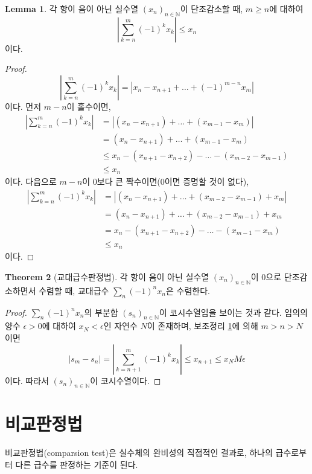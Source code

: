 \documentclass[11pt]{book}
\numberwithin{equation}{chapter}
\def\NN{\mathbb{N}}
\def\eps{\epsilon}
\newcommand{\abs}[1]{\left\vert#1\right\vert}
\theoremstyle{definition}
\newtheorem{thm}{Theorem}[section]
\newtheorem{lem}[thm]{Lemma}
\begin{document}
\begin{lem} \label{lem 5.2.2}
    각 항이 음이 아닌 실수열 \((x_n)_{n \in \NN}\)이 단조감소할 때, \(m \ge n\)에 대하여
    \[
    \abs{\sum_{k=n}^m (-1)^k x_k } \le x_n
    \]
    이다.
\end{lem}
\begin{proof}
    \[
        \abs{\sum_{k=n}^m (-1)^k x_k } = \abs{x_n - x_{n+1} + \ldots + (-1)^{m-n} x_m}
    \]
    이다. 먼저 \(m - n\)이 홀수이면,
    \begin{align*}
        \abs{\sum_{k=n}^m (-1)^k x_k } &= \abs{(x_n - x_{n+1}) + \ldots + (x_{m-1} - x_m)}\\
        &= (x_n - x_{n+1}) + \ldots + (x_{m-1} - x_m)\\
        &\le x_n - (x_{n+1} - x_{n+2}) - \ldots - (x_{m-2} - x_{m-1})\\
        &\le x_n
    \end{align*}
    이다. 다음으로 \(m - n\)이 0보다 큰 짝수이면(0이면 증명할 것이 없다),
    \begin{align*}
        \abs{\sum_{k=n}^m (-1)^k x_k } &= \abs{(x_n - x_{n+1}) + \ldots + (x_{m-2} - x_{m-1}) + x_{m}}\\
        &= (x_n - x_{n+1}) + \ldots + (x_{m-2} - x_{m-1}) + x_{m}\\
        &= x_n - (x_{n+1} - x_{n+2}) - \ldots - (x_{m-1} - x_m)\\
        &\le x_n
    \end{align*}
    이다.
\end{proof}

\begin{thm}[교대급수판정법]
    각 항이 음이 아닌 실수열 \((x_n)_{n \in \NN}\)이 0으로 단조감소하면서 수렴할 때, 교대급수 \(\sum_n (-1)^n x_n\)은 수렴한다.
\end{thm}
\begin{proof}
    \(\sum_n (-1)^n x_n\)의 부분합 \((s_n)_{n \in \NN}\)이 코시수열임을 보이는 것과 같다. 임의의 양수 \(\eps > 0\)에 대하여 \(x_N < \eps\)인 자연수 \(N\)이 존재하며, 보조정리 \ref{lem 5.2.2}에 의해 \(m > n > N\)이면
    \[
    \abs{s_m - s_n} = \abs{\sum_{k=n+1}^m (-1)^k x_k} \le x_{n+1} \le x_N M \eps
    \]
    이다. 따라서 \((s_n)_{n \in \NN}\)이 코시수열이다.
\end{proof}

\section{비교판정법}

비교판정법(comparsion test)은 실수체의 완비성의 직접적인 결과로, 하나의 급수로부터 다른 급수를 판정하는 기준이 된다.
\end{document}
